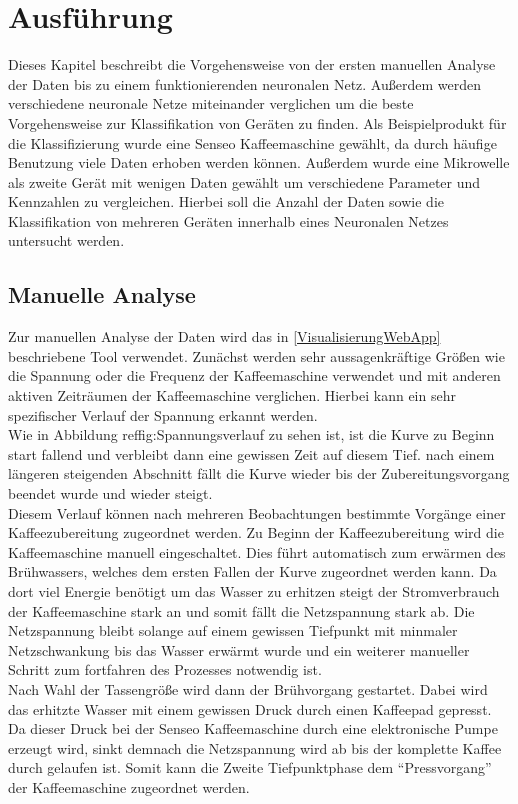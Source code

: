 \chapter{Ausführung}

    Dieses Kapitel beschreibt die Vorgehensweise von der ersten manuellen Analyse der Daten bis zu einem funktionierenden neuronalen Netz.
    Außerdem werden verschiedene neuronale Netze miteinander verglichen um die beste Vorgehensweise zur Klassifikation von Geräten zu finden.
    Als Beispielprodukt für die Klassifizierung wurde eine Senseo Kaffeemaschine gewählt, da durch häufige Benutzung viele Daten erhoben werden können. 
    Außerdem wurde eine Mikrowelle als zweite Gerät mit wenigen Daten gewählt um verschiedene Parameter und Kennzahlen zu vergleichen.
    Hierbei soll die Anzahl der Daten sowie die Klassifikation von mehreren Geräten innerhalb eines Neuronalen Netzes untersucht werden.

\section{Manuelle Analyse} \label{ManuelleAnalyse}

    Zur manuellen Analyse der Daten wird das in \ref{VisualisierungWebApp} beschriebene Tool verwendet.
    Zunächst werden sehr aussagenkräftige Größen wie die Spannung oder die Frequenz der Kaffeemaschine verwendet und mit anderen aktiven Zeiträumen der Kaffeemaschine verglichen.
    Hierbei kann ein sehr spezifischer Verlauf der Spannung erkannt werden.\\ 
    Wie in Abbildung ref{fig:Spannungsverlauf} zu sehen ist, ist die Kurve zu Beginn start fallend und verbleibt dann eine gewissen Zeit auf diesem Tief. 
    nach einem längeren steigenden Abschnitt fällt die Kurve wieder bis der Zubereitungsvorgang beendet wurde und wieder steigt.\\
    \newline
    Diesem Verlauf können nach mehreren Beobachtungen bestimmte Vorgänge einer Kaffeezubereitung zugeordnet werden.
    Zu Beginn der Kaffeezubereitung wird die Kaffeemaschine manuell eingeschaltet. 
    Dies führt automatisch zum erwärmen des Brühwassers, welches dem ersten Fallen der Kurve zugeordnet werden kann. 
    Da dort viel Energie benötigt um das Wasser zu erhitzen steigt der Stromverbrauch der Kaffeemaschine stark an und somit fällt die Netzspannung stark ab.
    Die Netzspannung bleibt solange auf einem gewissen Tiefpunkt mit minmaler Netzschwankung bis das Wasser erwärmt wurde und ein weiterer manueller Schritt zum fortfahren des Prozesses notwendig ist.\\
    Nach Wahl der Tassengröße wird dann der Brühvorgang gestartet. 
    Dabei wird das erhitzte Wasser mit einem gewissen Druck durch einen Kaffeepad gepresst. 
    Da dieser Druck bei der Senseo Kaffeemaschine durch eine elektronische Pumpe erzeugt wird, sinkt demnach die Netzspannung wird ab bis der komplette Kaffee durch gelaufen ist.
    Somit kann die Zweite Tiefpunktphase dem ``Pressvorgang'' der Kaffeemaschine zugeordnet werden.\\
    \newline
    
